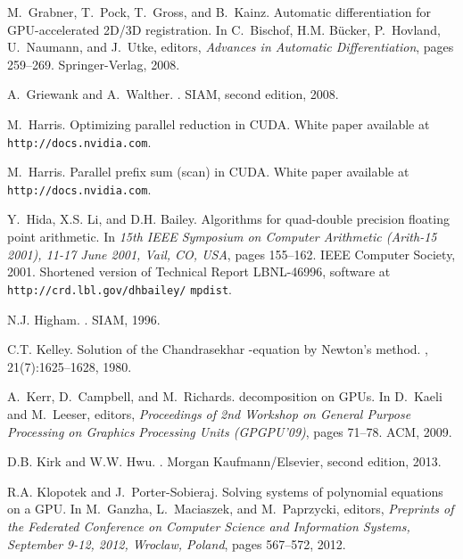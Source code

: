 \documentclass{article}
\begin{document}
\begin{thebibliography}{10}
M.~Grabner, T.~Pock, T.~Gross, and B.~Kainz.
\newblock Automatic differentiation for {GPU}-accelerated {2D/3D} registration.
\newblock In C.~Bischof, H.M. B{\"{u}}cker, P.~Hovland, U.~Naumann, and
  J.~Utke, editors, {\em Advances in Automatic Differentiation}, pages
  259--269. Springer-Verlag, 2008.

A.~Griewank and A.~Walther.
.
\newblock SIAM, second edition, 2008.

M.~Harris.
\newblock Optimizing parallel reduction in {CUDA}.
\newblock White paper available at {\tt http://docs.nvidia.com}.

M.~Harris.
\newblock Parallel prefix sum (scan) in {CUDA}.
\newblock White paper available at {\tt http://docs.nvidia.com}.

Y.~Hida, X.S. Li, and D.H. Bailey.
\newblock Algorithms for quad-double precision floating point arithmetic.
\newblock In {\em {15th IEEE Symposium on Computer Arithmetic (Arith-15 2001),
  11-17 June 2001, Vail, CO, USA}}, pages 155--162. IEEE Computer Society,
  2001.
\newblock Shortened version of Technical Report LBNL-46996, software at {\tt
  http://crd.lbl.gov/dhbailey/} {\tt mpdist}.

N.J. Higham.
.
\newblock SIAM, 1996.

C.T. Kelley.
\newblock Solution of the {C}handrasekhar -equation by {N}ewton's method.
, 21(7):1625--1628, 1980.

A.~Kerr, D.~Campbell, and M.~Richards.
 decomposition on {GPU}s.
\newblock In D.~Kaeli and M.~Leeser, editors, {\em Proceedings of 2nd Workshop
  on General Purpose Processing on Graphics Processing Units (GPGPU'09)}, pages
  71--78. ACM, 2009.

D.B. Kirk and W.W. Hwu.
.
\newblock Morgan Kaufmann/Elsevier, second edition, 2013.

R.A. Klopotek and J.~Porter-Sobieraj.
\newblock Solving systems of polynomial equations on a {GPU}.
\newblock In M.~Ganzha, L.~Maciaszek, and M.~Paprzycki, editors, {\em Preprints
  of the Federated Conference on Computer Science and Information Systems,
  September 9-12, 2012, Wroclaw, Poland}, pages 567--572, 2012.


\end{thebibliography}
\end{document}
